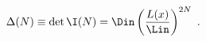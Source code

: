 \begin{equation}
  \label{eq:DNdetIN}
  \Delta(N)\equiv\det\I(N)= \Din\left(\frac{L(x)}{\Lin} \right)^{2N}\ .
\end{equation}

